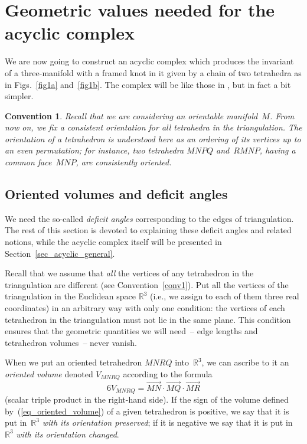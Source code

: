 \documentclass[pdftex]{sigma}
\newtheorem{convention}{Convention}}
\begin{document}
\section{Geometric values needed for the acyclic complex}
\label{sec_deficit_angles}

We are now going to construct an acyclic complex which produces the invariant of a three-manifold with a framed knot in it given by a chain of two tetrahedra as in Figs.~\ref{fig1a} and~\ref{fig1b}. The complex will be like those in \cite{TMP24, TMP15}, but in fact a bit simpler.

\begin{convention}
\label{conv2}
Recall that we are considering an \emph{orientable} manifold~$M$. From now on, we f\/ix a \emph{consistent orientation} for all tetrahedra in the triangulation. The orientation of a tetrahedron is understood here as an ordering of its vertices up to an even permutation; for instance, two tetrahedra $MNPQ$ and~$RMNP$, having a common face~$MNP$, are consistently oriented.
\end{convention}

\subsection{Oriented volumes and def\/icit angles}
\label{subs_daav}
We need the so-called \emph{deficit angles} corresponding to the edges of triangulation. The rest of this section is devoted to explaining these def\/icit angles and related notions, while the acyclic complex itself will be presented in Section~\ref{sec_acyclic_general}.

Recall that we assume that \emph{all} the vertices of any tetrahedron in the triangulation are dif\/ferent (see Convention~\ref{conv1}). Put all the vertices of the triangulation in the Euclidean space $\mathbb R^3$ (i.e., we assign to each of them three real coordinates) in an arbitrary way with only one condition: the vertices of each tetrahedron in the triangulation must not lie in the same plane. This condition ensures that the geometric quantities we will need~-- edge lengths and tetrahedron volumes~-- never vanish.

When we put an oriented tetrahedron $MNRQ$ into~$\mathbb R^3$, we can ascribe to it an \emph{oriented volume} denoted $V_{MNRQ}$ according to the formula
\begin{equation}
6V_{MNRQ}=\overrightarrow{MN} \cdot \overrightarrow{MQ} \cdot \overrightarrow{MR}
\label{eq_oriented_volume}
\end{equation}
(scalar triple product in the right-hand side). If the sign of the volume def\/ined by~(\ref{eq_oriented_volume}) of a given tetrahedron is positive, we say that it is put in~$\mathbb R^3$ \emph{with its orientation preserved}; if it is negative we say that it is put in~$\mathbb R^3$ \emph{with its orientation changed}.
\end{document}
